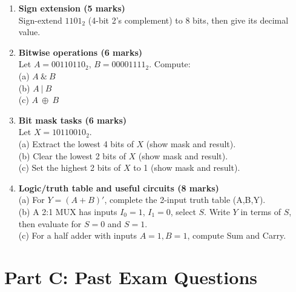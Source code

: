 \documentclass[11pt]{article}
\begin{document}
\begin{enumerate}[label=\textbf{B\arabic*.}]
  \item \textbf{Sign extension (5 marks)}\\
  Sign-extend \(1101_2\) (4-bit 2's complement) to 8 bits, then give its decimal value.

  \item \textbf{Bitwise operations (6 marks)}\\
  Let \(A=00110110_2\), \(B=00001111_2\). Compute:\\
  (a) \(A\ \&\ B\)\\
  (b) \(A\ |\ B\)\\
  (c) \(A\ \oplus\ B\)

  \item \textbf{Bit mask tasks (6 marks)}\\
  Let \(X=10110010_2\).\\
  (a) Extract the lowest 4 bits of \(X\) (show mask and result).\\
  (b) Clear the lowest 2 bits of \(X\) (show mask and result).\\
  (c) Set the highest 2 bits of \(X\) to 1 (show mask and result).

  \item \textbf{Logic/truth table and useful circuits (8 marks)}\\
  (a) For \(Y=(A+B)'\), complete the 2-input truth table (A,B,Y).\\
  (b) A 2:1 MUX has inputs \(I_0=1\), \(I_1=0\), select \(S\). Write \(Y\) in terms of \(S\), then evaluate for \(S=0\) and \(S=1\).\\
  (c) For a half adder with inputs \(A=1, B=1\), compute Sum and Carry.
\end{enumerate}


\section*{Part C: Past Exam Questions}
\end{document}
